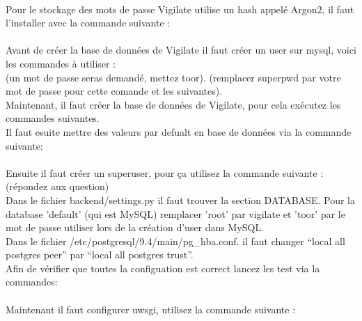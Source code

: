 \\
Pour le stockage des mots de passe Vigilate utilise un hash appelé Argon2, il faut l’installer avec la commande suivante :\\
\\
Avant de créer la base de données de Vigilate il faut créer un user sur mysql, voici les commandes à utiliser :\\
 (un mot de passe seras demandé, mettez toor).
 (remplacer superpwd par votre mot de passe pour cette comande et les suivantes).
\\
Maintenant, il faut créer la base de données de Vigilate, pour cela exécutez les commandes suivantes.
\\
Il faut esuite mettre des valeurs par defualt en base de données via la commande suivante:\\
\\
Ensuite il faut créer un superuser, pour ça utilisez la commande suivante : (répondez aux question)
\\
Dans le fichier backend/settings.py il faut trouver la section DATABASE. Pour la database 'default' (qui est MySQL) remplacer 'root' par vigilate et 'toor' par le mot de passe utiliser lors de la création d'user dans MySQL.
\\
Dans le fichier /etc/postgresql/9.4/main/pg\_hba.conf. il faut changer ``local   all         postgres                          peer'' par ``local   all         postgres                          trust''.
\\
Afin de vérifier que toutes la configuation est correct lancez les test via la commandes:\\
\\
Maintenant il faut configurer uwsgi, utilisez la commande suivante :\\
\\
